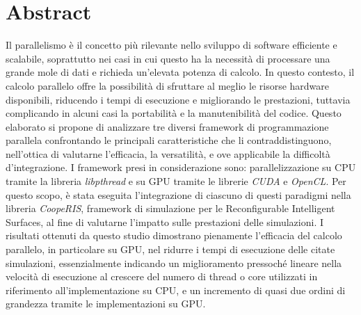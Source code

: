 \chapter*{Abstract}
\label{cha:abtract}

Il parallelismo è il concetto più rilevante nello sviluppo di software
efficiente e scalabile, soprattutto nei casi in cui questo ha la necessità di processare
una grande mole di dati e richieda un'elevata potenza di calcolo. In questo
contesto, il calcolo parallelo offre la possibilità di sfruttare al meglio le risorse
hardware disponibili, riducendo i tempi di esecuzione e migliorando le
prestazioni, tuttavia complicando in alcuni casi la portabilità e la manutenibilità
del codice. Questo elaborato si propone di analizzare tre diversi framework di
programmazione parallela confrontando le principali caratteristiche che li
contraddistinguono, nell'ottica di valutarne l'efficacia, la versatilità, e ove applicabile
la difficoltà d'integrazione. I framework presi in considerazione sono: parallelizzazione
su CPU tramite la libreria \textit{libpthread} e su GPU tramite le librerie
\textit{CUDA} e \textit{OpenCL}. Per questo scopo, è stata eseguita l'integrazione
di ciascuno di questi paradigmi nella libreria \textit{CoopeRIS}, framework di
simulazione per le Reconfigurable Intelligent Surfaces, al fine di valutarne l'impatto
sulle prestazioni delle simulazioni. I risultati ottenuti da questo studio
dimostrano pienamente l'efficacia del calcolo parallelo, in particolare su GPU,
nel ridurre i tempi di esecuzione delle citate simulazioni, essenzialmente indicando
un miglioramento pressoché lineare nella velocità di esecuzione al crescere del numero
di thread o core utilizzati in riferimento all'implementazione su CPU, e un
incremento di quasi due ordini di grandezza tramite le implementazioni su GPU.